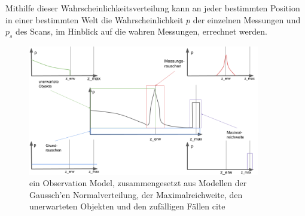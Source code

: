 Mithilfe dieser Wahrscheinlichkeitsverteilung kann an jeder bestimmten Position in einer bestimmten Welt die Wahrscheinlichkeit $p$ der einzelnen Messungen und $p_s$ des Scans, im Hinblick auf die wahren Messungen, errechnet werden.
\begin{figure}[b]
    \centering
    \includegraphics[width=0.9\textwidth]{pic/vorwissen/observation_model.png}
    \caption{ein Observation Model, zusammengesetzt aus Modellen der Gaussch'en Normalverteilung, der Maximalreichweite, den unerwarteten Objekten und den zufälligen Fällen cite}
    \label{fig:observation_model}
\end{figure}

